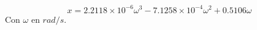 \documentclass[main]{subfiles}
\begin{document}
\begin{equation}
x=2.2118\times 10^{-6}\omega^3 -7.1258\times 10^{-4}\omega^2+0.5106\omega
\end{equation}
Con $\omega$ en $rad/s$.
%
%
%
\end{document}
